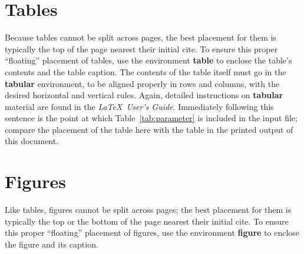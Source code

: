 \documentclass{cocseArticle}
\begin{document}
\section{Tables}
Because tables cannot be split across pages, the best
placement for them is typically the top of the page
nearest their initial cite.  To
ensure this proper ``floating'' placement of tables, use the
environment \textbf{table} to enclose the table's contents and
the table caption. The contents of the table itself must go
in the \textbf{tabular} environment, to
be aligned properly in rows and columns, with the desired
horizontal and vertical rules.  Again, detailed instructions
on \textbf{tabular} material
are found in the \textit{\LaTeX\ User's Guide}. Immediately following this sentence is the point at which
Table~\ref{tab:parameter} is included in the input file; compare the
placement of the table here with the table in the printed
output of this document.

\begin{table}
	\label{tab:parameter}%
\end{table}

\section{Figures}

Like tables, figures cannot be split across pages; the best placement
for them is typically the top or the bottom of the page nearest their initial cite.  To ensure this proper ``floating'' placement of figures, use the environment \textbf{figure} to enclose the figure and its caption.
\end{document}
